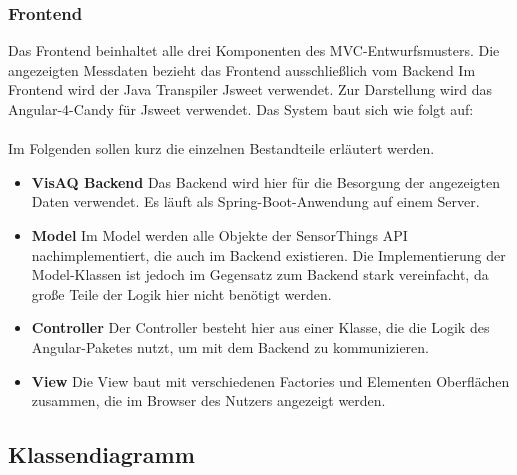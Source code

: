\subsubsection{Frontend}
Das Frontend beinhaltet alle drei Komponenten des \gls{MVC}-Entwurfsmusters. Die angezeigten Messdaten bezieht das \softwarename Frontend ausschließlich vom \softwarename Backend
Im Frontend wird der Java Transpiler \gls{Jsweet} verwendet. Zur Darstellung wird das \gls{Angular-4-Candy} für \gls{Jsweet} verwendet.
Das System baut sich wie folgt auf:
\\

\\
Im Folgenden sollen kurz die einzelnen Bestandteile erläutert werden.
\begin{itemize}
    \item \textbf{VisAQ Backend} Das \softwarename Backend wird hier für die Besorgung der angezeigten Daten verwendet. Es läuft als Spring-Boot-Anwendung auf einem Server.
    \item \textbf{Model} Im Model werden alle Objekte der \gls{SensorThings API} nachimplementiert, die auch im Backend existieren.
    Die Implementierung der Model-Klassen ist jedoch im Gegensatz zum Backend stark vereinfacht, da große Teile der Logik hier nicht benötigt werden.
    \item \textbf{Controller} Der Controller besteht hier aus einer Klasse, die die Logik des Angular-Paketes nutzt, um mit dem Backend zu kommunizieren.
    \item \textbf{View} Die View baut mit verschiedenen Factories und Elementen Oberflächen zusammen, die im Browser des Nutzers angezeigt werden.
\end{itemize}

\subsection{Klassendiagramm}
